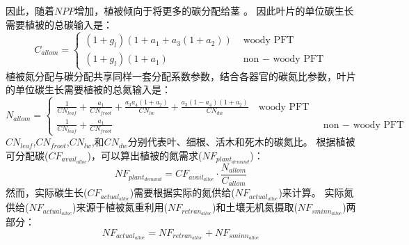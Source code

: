 因此，随着$NPP$增加，植被倾向于将更多的碳分配给茎 \citep{allen2005,vanninen2005carbon}。
因此叶片的单位碳生长需要植被的总碳输入是：
\begin{equation}\label{C_allom}
C_{ {allom }}=\left\{\begin{array}{lr}\left(1+g_{l}\right)\left(1+a_{1}+a_{3}\left(1+a_{2}\right)\right) &  \text{ woody } \text{PFT} \\ 
  \left(1+g_{l}\right)\left(1+a_{1}\right) &  \text{ non }- \text{ woody } \text{PFT}\end{array}\right.
\end{equation}
植被氮分配与碳分配共享同样一套分配系数参数，结合各器官的碳氮比参数，叶片的单位碳生长需要植被的总氮输入是：
\begin{equation}\label{N_allom}
N_{ {allom }}=\left\{\begin{array}{lr}\frac{1}{CN_{ {leaf }}}+\frac{a_{1}}{CN_{ {froot }}}+\frac{a_{3} a_{4}\left(1+a_{2}\right)}
  {CN_{l w}}+\frac{a_{3}\left(1-a_{4}\right)\left(1+a_{2}\right)}{CN_{d w}} \ \ \  \text { woody PFT } \\ 
  \frac{1}{CN_{ {leaf }}}+\frac{a_{1}}{CN_{ {froot }}} & \text { non }- \text{ woody PFT }\end{array}\right.
\end{equation}
$CN_{leaf}$,$CN_{froot}$,$CN_{lw}$,和$CN_{dw}$分别代表叶、细根、活木和死木的碳氮比。
根据植被可分配碳($CF_{avail_{alloc}}$)，可以算出植被的氮需求($NF_{plant_{demand}}$)：
\begin{equation}
N F_{ {plant_{demand }}}=CF_{ {avail_{alloc }}} \cdot \frac{N_{ {allom }}}{C_{ {allom }}}
\end{equation}
然而，实际碳生长($CF_{actual_{alloc}}$)需要根据实际的氮供给($NF_{actual_{alloc}}$)来计算。
实际氮供给($NF_{actual_{alloc}}$)来源于植被氮重利用($NF_{retran_{alloc}}$)和土壤无机氮摄取($NF_{sminn_{alloc}}$)两部分：
\begin{equation}\label{NF_actual_alloc}
NF_{actual_{alloc}}=NF_{retran_{alloc}}+NF_{sminn_{alloc}}
\end{equation}



